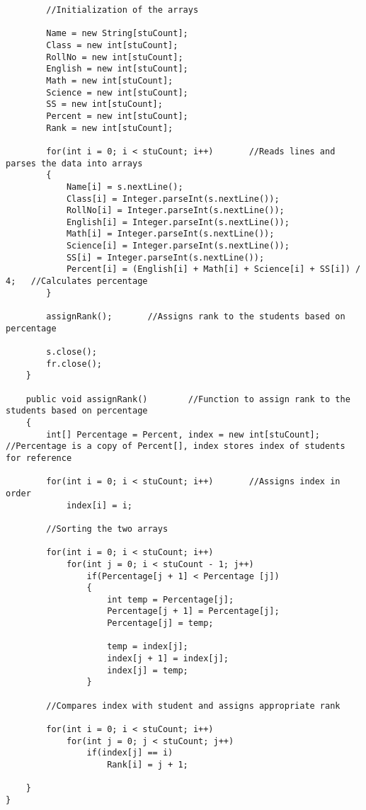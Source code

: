 \documentclass[ProgramminAssignment.tex]{subfiles}
\begin{document}
\begin{lstlisting}
		//Initialization of the arrays
		
		Name = new String[stuCount];
		Class = new int[stuCount];
		RollNo = new int[stuCount];
		English = new int[stuCount];
		Math = new int[stuCount];
		Science = new int[stuCount];
		SS = new int[stuCount];
		Percent = new int[stuCount];
		Rank = new int[stuCount];
		
		for(int i = 0; i < stuCount; i++)		//Reads lines and parses the data into arrays
		{
			Name[i] = s.nextLine();
			Class[i] = Integer.parseInt(s.nextLine());
			RollNo[i] = Integer.parseInt(s.nextLine());
			English[i] = Integer.parseInt(s.nextLine());
			Math[i] = Integer.parseInt(s.nextLine());
			Science[i] = Integer.parseInt(s.nextLine());
			SS[i] = Integer.parseInt(s.nextLine());
			Percent[i] = (English[i] + Math[i] + Science[i] + SS[i]) / 4;	//Calculates percentage
		}
		
		assignRank();		//Assigns rank to the students based on percentage
		
		s.close();
		fr.close();
	}
	
	public void assignRank()		//Function to assign rank to the students based on percentage
	{
		int[] Percentage = Percent, index = new int[stuCount];		//Percentage is a copy of Percent[], index stores index of students for reference
		
		for(int i = 0; i < stuCount; i++)		//Assigns index in order
			index[i] = i;
		
		//Sorting the two arrays
		
		for(int i = 0; i < stuCount; i++)
			for(int j = 0; i < stuCount - 1; j++)
				if(Percentage[j + 1] < Percentage [j])
				{
					int temp = Percentage[j];
					Percentage[j + 1] = Percentage[j];
					Percentage[j] = temp;
					
					temp = index[j];
					index[j + 1] = index[j];
					index[j] = temp;
				}
		
		//Compares index with student and assigns appropriate rank
		
		for(int i = 0; i < stuCount; i++)
			for(int j = 0; j < stuCount; j++)
				if(index[j] == i)
					Rank[i] = j + 1;
		
	}
}

\end{lstlisting}
\end{document}
